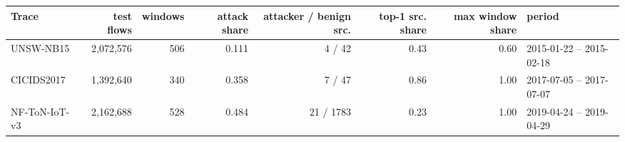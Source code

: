 \begin{tabular}{@{}lrrrrrrl@{}}
\toprule
Trace & test flows & windows & attack share & attacker / benign src. & top-1 src. share & max window share & period \\
\midrule
UNSW-NB15 & 2,072,576 & 506 & 0.111 & 4 / 42 & 0.43 & 0.60 & 2015-01-22 -- 2015-02-18 \\
CICIDS2017 & 1,392,640 & 340 & 0.358 & 7 / 47 & 0.86 & 1.00 & 2017-07-05 -- 2017-07-07 \\
NF-ToN-IoT-v3 & 2,162,688 & 528 & 0.484 & 21 / 1783 & 0.23 & 1.00 & 2019-04-24 -- 2019-04-29 \\
\bottomrule
\end{tabular}